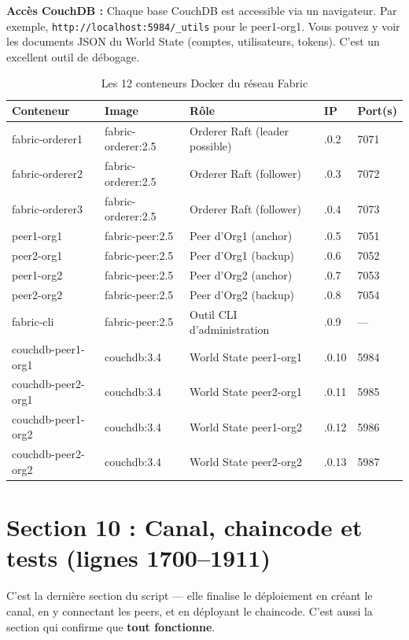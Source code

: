 \documentclass[12pt,a4paper,twoside]{report}
\begin{document}
\begin{tipbox}
\textbf{Accès CouchDB :} Chaque base CouchDB est accessible via un navigateur. Par exemple, \texttt{http://localhost:5984/\_utils} pour le peer1-org1. Vous pouvez y voir les documents JSON du World State (comptes, utilisateurs, tokens). C'est un excellent outil de débogage.
\end{tipbox}

\begin{table}[H]
\centering
\begin{tabularx}{\textwidth}{llXll}
\toprule
\textbf{Conteneur} & \textbf{Image} & \textbf{Rôle} & \textbf{IP} & \textbf{Port(s)} \\
\midrule
fabric-orderer1 & fabric-orderer:2.5 & Orderer Raft (leader possible) & .0.2 & 7071 \\
fabric-orderer2 & fabric-orderer:2.5 & Orderer Raft (follower) & .0.3 & 7072 \\
fabric-orderer3 & fabric-orderer:2.5 & Orderer Raft (follower) & .0.4 & 7073 \\
peer1-org1 & fabric-peer:2.5 & Peer d'Org1 (anchor) & .0.5 & 7051 \\
peer2-org1 & fabric-peer:2.5 & Peer d'Org1 (backup) & .0.6 & 7052 \\
peer1-org2 & fabric-peer:2.5 & Peer d'Org2 (anchor) & .0.7 & 7053 \\
peer2-org2 & fabric-peer:2.5 & Peer d'Org2 (backup) & .0.8 & 7054 \\
fabric-cli & fabric-peer:2.5 & Outil CLI d'administration & .0.9 & --- \\
couchdb-peer1-org1 & couchdb:3.4 & World State peer1-org1 & .0.10 & 5984 \\
couchdb-peer2-org1 & couchdb:3.4 & World State peer2-org1 & .0.11 & 5985 \\
couchdb-peer1-org2 & couchdb:3.4 & World State peer1-org2 & .0.12 & 5986 \\
couchdb-peer2-org2 & couchdb:3.4 & World State peer2-org2 & .0.13 & 5987 \\
\bottomrule
\end{tabularx}
\caption{Les 12 conteneurs Docker du réseau Fabric}
\end{table}

\section{Section 10 : Canal, chaincode et tests (lignes 1700--1911)}

C'est la dernière section du script --- elle finalise le déploiement en créant le canal, en y connectant les peers, et en déployant le chaincode. C'est aussi la section qui confirme que \textbf{tout fonctionne}.
\end{document}
